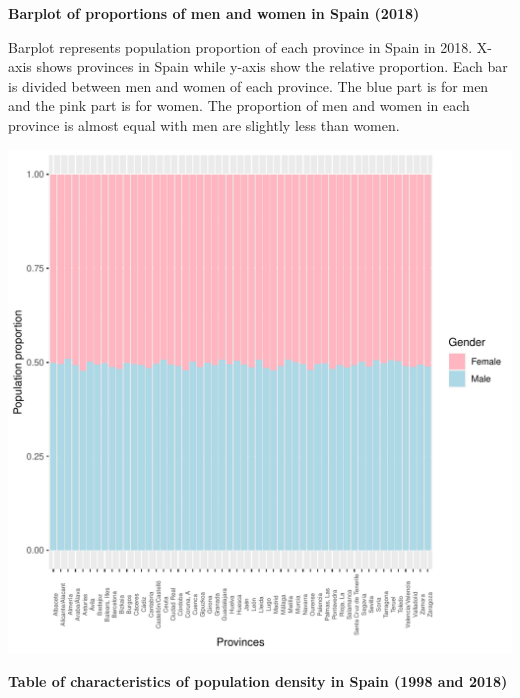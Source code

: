 \documentclass[12pt, oneside]{report}\usepackage[]{graphicx}\usepackage[]{color}
\makeatletter
\def\maxwidth{ %
  \ifdim\Gin@nat@width>\linewidth
    \linewidth
  \else
    \Gin@nat@width
  \fi
}
\makeatother
\begin{document}
\newpage
\begin{center}
\textbf {Barplot of proportions of men and women in Spain (2018)} \\
\end{center}
Barplot represents population proportion of each province in Spain in 2018. X-axis shows provinces in Spain while y-axis show the relative proportion. Each bar is divided between men and women of each province. The blue part is for men and the pink part is for women. The proportion of men and women in each province is almost equal with men are slightly less than women.
\begin{Schunk}

\includegraphics[width=\maxwidth]{figure/unnamed-chunk-16-1} \end{Schunk}

\newpage
\begin{center}
\textbf {Table of characteristics of population density in Spain (1998 and 2018)}
\end{center}
\end{document}
